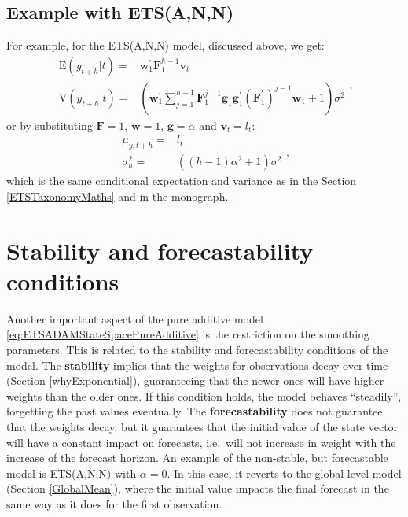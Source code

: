 \documentclass[
]{book}
\theoremstyle{definition}
\theoremstyle{definition}
\theoremstyle{definition}
\theoremstyle{definition}
\theoremstyle{remark}
\begin{document}
\hypertarget{example-with-etsann}{%
\subsection{Example with ETS(A,N,N)}\label{example-with-etsann}}

For example, for the ETS(A,N,N) model, discussed above, we get:
\begin{equation}
  \begin{aligned}
    \text{E}(y_{t+h}|t) = & \mathbf{w}_{1}^\prime \mathbf{F}_{1}^{h-1} \mathbf{v}_{t} \\
    \text{V}(y_{t+h}|t) = & \left(\mathbf{w}_{1}^\prime \sum_{j=1}^{h-1} \mathbf{F}_{1}^{j-1} \mathbf{g}_{1} \mathbf{g}^\prime_{1} (\mathbf{F}_{1}^\prime)^{j-1} \mathbf{w}_{1} + 1 \right) \sigma^2
  \end{aligned},
  \label{eq:ETSADAMStateSpaceANNRecursionMeanAndVarianceGeneral}
\end{equation}
or by substituting \(\mathbf{F}=1\), \(\mathbf{w}=1\), \(\mathbf{g}=\alpha\) and \(\mathbf{v}_t=l_t\):
\begin{equation}
  \begin{aligned}
    \mu_{y,t+h} = & l_{t} \\
    \sigma^2_{h} = & \left((h-1) \alpha^2 + 1 \right) \sigma^2
  \end{aligned},
  \label{eq:ETSADAMStateSpaceANNRecursionMeanAndVariance}
\end{equation}
which is the same conditional expectation and variance as in the Section \ref{ETSTaxonomyMaths} and in the \citet{Hyndman2008b} monograph.

\hypertarget{stabilityConditionAdditiveError}{%
\section{Stability and forecastability conditions}\label{stabilityConditionAdditiveError}}

Another important aspect of the pure additive model \eqref{eq:ETSADAMStateSpacePureAdditive} is the restriction on the smoothing parameters. This is related to the stability and forecastability conditions of the model. The \textbf{stability} implies that the weights for observations decay over time (Section \ref{whyExponential}), guaranteeing that the newer ones will have higher weights than the older ones. If this condition holds, the model behaves ``steadily'', forgetting the past values eventually. The \textbf{forecastability} does not guarantee that the weights decay, but it guarantees that the initial value of the state vector will have a constant impact on forecasts, i.e.~will not increase in weight with the increase of the forecast horizon. An example of the non-stable, but forecastable model is ETS(A,N,N) with \(\alpha=0\). In this case, it reverts to the global level model (Section \ref{GlobalMean}), where the initial value impacts the final forecast in the same way as it does for the first observation.
\end{document}
